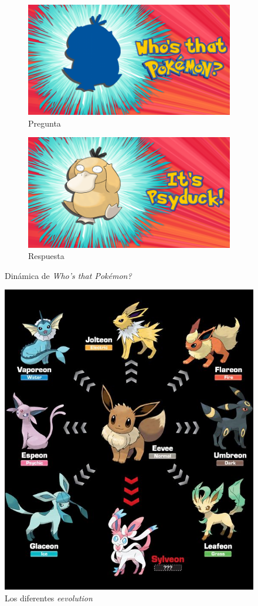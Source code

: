 \documentclass[transmag]{IEEEtran}
\begin{document}
\begin{figure}[H]
	\begin{subfigure}{0.5\textwidth}
		\centering
		\includegraphics[width=0.8\linewidth]{who1}
		\caption{Pregunta}
	\end{subfigure}
	\begin{subfigure}{0.5\textwidth}
		\centering
		\includegraphics[width=0.8\linewidth]{who2}
		\caption{Respuesta}
	\end{subfigure}
	\caption{Dinámica de \textit{Who's that Pokémon?}}
	\label{fig:who}
\end{figure}

\begin{figure}
	\centering
	\includegraphics[width=0.8\linewidth]{eevolutions}
	\caption{Los diferentes \textit{eevolution}}
	\label{fig:eevolution}
\end{figure}
\end{document}
